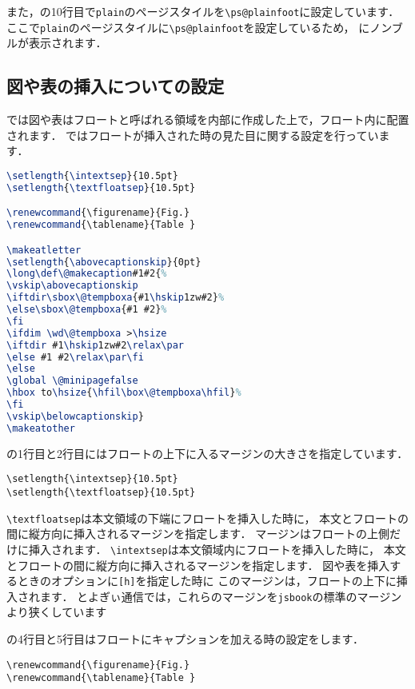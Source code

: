 また，の10行目で\verb|plain|のページスタイルを\verb|\ps@plainfoot|に設定しています．
ここで\verb|plain|のページスタイルに\verb|\ps@plainfoot|を設定しているため，
にノンブルが表示されます．

\subsection{図や表の挿入についての設定}

{\pLaTeX}では図や表はフロートと呼ばれる領域を内部に作成した上で，フロート内に配置されます．
ではフロートが挿入された時の見た目に関する設定を行っています．
\begin{lstlisting}[caption = フロートついての設定, label = list:float, language = tex]
\setlength{\intextsep}{10.5pt}
\setlength{\textfloatsep}{10.5pt}

\renewcommand{\figurename}{Fig.}
\renewcommand{\tablename}{Table }

\makeatletter
\setlength{\abovecaptionskip}{0pt}
\long\def\@makecaption#1#2{%
\vskip\abovecaptionskip
\iftdir\sbox\@tempboxa{#1\hskip1zw#2}%
\else\sbox\@tempboxa{#1 #2}%
\fi
\ifdim \wd\@tempboxa >\hsize
\iftdir #1\hskip1zw#2\relax\par
\else #1 #2\relax\par\fi
\else
\global \@minipagefalse
\hbox to\hsize{\hfil\box\@tempboxa\hfil}%
\fi
\vskip\belowcaptionskip}
\makeatother
\end{lstlisting}


の1行目と2行目にはフロートの上下に入るマージンの大きさを指定しています．
\begin{verbatim}
\setlength{\intextsep}{10.5pt}
\setlength{\textfloatsep}{10.5pt}
\end{verbatim}

\verb|\textfloatsep|は本文領域の下端にフロートを挿入した時に，
本文とフロートの間に縦方向に挿入されるマージンを指定します．
マージンはフロートの上側だけに挿入されます．
\verb|\intextsep|は本文領域内にフロートを挿入した時に，
本文とフロートの間に縦方向に挿入されるマージンを指定します．
図や表を挿入するときのオプションに\texttt{[h]}を指定した時に
このマージンは，フロートの上下に挿入されます．
とよぎぃ通信では，これらのマージンを\texttt{jsbook}の標準のマージンより狭くしています

の4行目と5行目はフロートにキャプションを加える時の設定をします．
\begin{verbatim}
\renewcommand{\figurename}{Fig.}
\renewcommand{\tablename}{Table }
\end{verbatim}

